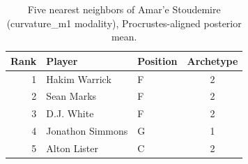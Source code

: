 \begin{table}[htbp]
  \centering\small
  \begin{tabular}{rllc}
    \toprule
    Rank & Player & Position & Archetype \\
    \midrule
    1 & Hakim Warrick & F & 2 \\
    2 & Sean Marks & F & 2 \\
    3 & D.J. White & F & 2 \\
    4 & Jonathon Simmons & G & 1 \\
    5 & Alton Lister & C & 2 \\
    \bottomrule
  \end{tabular}
  \caption{Five nearest neighbors of Amar'e Stoudemire (curvature_m1 modality), Procrustes-aligned posterior mean.}
  \label{tab:Amar_e_Stoudemire_neighbors_curvature_m1}
\end{table}

